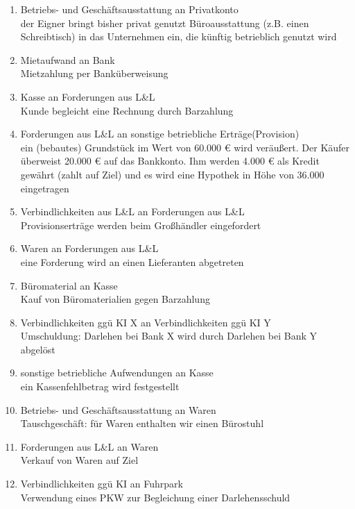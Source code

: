 \documentclass[paper=a4, fontsize=11pt]{scrartcl}
\numberwithin{equation}{section}
\numberwithin{figure}{section}
\numberwithin{table}{section}
\begin{document}
\begin{enumerate}
\item Betriebs- und Geschäftsausstattung an Privatkonto \\
der Eigner bringt bisher privat genutzt Büroausstattung (z.B. einen Schreibtisch) in das Unternehmen ein, die künftig betrieblich genutzt wird
\item Mietaufwand an Bank \\
Mietzahlung per Banküberweisung
\item Kasse an Forderungen aus L\&L \\
Kunde begleicht eine Rechnung durch Barzahlung
\item Forderungen aus L\&L an sonstige betriebliche Erträge(Provision) \\
ein (bebautes) Grundstück im Wert von 60.000 € wird veräußert. Der Käufer überweist 20.000 € auf das Bankkonto. Ihm werden 4.000 € als Kredit gewährt (zahlt auf Ziel) und es wird eine Hypothek in Höhe von 36.000 eingetragen
\item Verbindlichkeiten aus L\&L an Forderungen aus L\&L \\
Provisionserträge werden beim Großhändler eingefordert
\item Waren an Forderungen aus L\&L \\
eine Forderung wird an einen Lieferanten abgetreten
\item Büromaterial an Kasse \\
Kauf von Büromaterialien gegen Barzahlung
\item Verbindlichkeiten ggü KI X an Verbindlichkeiten ggü KI Y \\
Umschuldung: Darlehen bei Bank X wird durch Darlehen bei Bank Y abgelöst
\item sonstige betriebliche Aufwendungen an Kasse \\
ein Kassenfehlbetrag wird festgestellt
\item Betriebs- und Geschäftsausstattung an Waren \\
Tauschgeschäft: für Waren enthalten wir einen Bürostuhl
\item Forderungen aus L\&L an Waren \\
Verkauf von Waren auf Ziel
\item Verbindlichkeiten ggü KI an Fuhrpark \\
Verwendung eines PKW zur Begleichung einer Darlehensschuld
\end{enumerate} 
\end{document}
